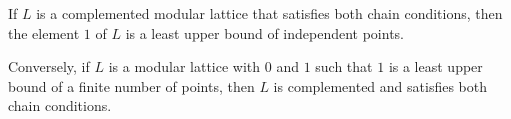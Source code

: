 If $L$ is a complemented modular lattice that satisfies both chain conditions, then the element $1$ of $L$ is a least upper bound of independent points.

Conversely, if $L$ is a modular lattice with $0$ and $1$ such that $1$ is a least upper bound of a finite number of points, then $L$ is complemented and satisfies both chain conditions.
